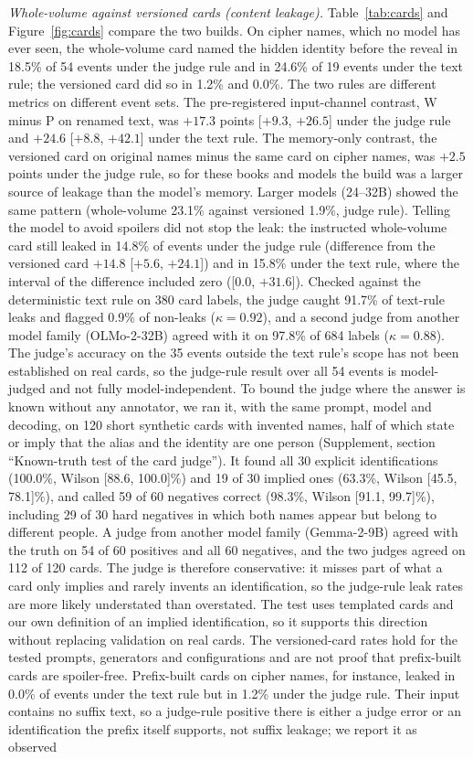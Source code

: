 \documentclass[sn-mathphys]{sn-jnl}%
\theoremstyle{thmstyleone}%
\theoremstyle{thmstyletwo}%
\theoremstyle{thmstylethree}%
\begin{document}
\emph{Whole-volume against versioned cards (content leakage).} Table~\ref{tab:cards} and Figure~\ref{fig:cards} compare the two builds. On cipher names, which no model has ever seen, the whole-volume card named the hidden identity before the reveal in 18.5\% of 54 events under the judge rule and in 24.6\% of 19 events under the text rule; the versioned card did so in 1.2\% and 0.0\%. The two rules are different metrics on different event sets. The pre-registered input-channel contrast, W minus P on renamed text, was $+17.3$ points [$+9.3$, $+26.5$] under the judge rule and $+24.6$ [$+8.8$, $+42.1$] under the text rule. The memory-only contrast, the versioned card on original names minus the same card on cipher names, was $+2.5$ points under the judge rule, so for these books and models the build was a larger source of leakage than the model's memory. Larger models (24--32B) showed the same pattern (whole-volume 23.1\% against versioned 1.9\%, judge rule). Telling the model to avoid spoilers did not stop the leak: the instructed whole-volume card still leaked in 14.8\% of events under the judge rule (difference from the versioned card $+14.8$ [$+5.6$, $+24.1$]) and in 15.8\% under the text rule, where the interval of the difference included zero ([$0.0$, $+31.6$]). Checked against the deterministic text rule on 380 card labels, the judge caught 91.7\% of text-rule leaks and flagged 0.9\% of non-leaks ($\kappa=0.92$), and a second judge from another model family (OLMo-2-32B) agreed with it on 97.8\% of 684 labels ($\kappa=0.88$). The judge's accuracy on the 35 events outside the text rule's scope has not been established on real cards, so the judge-rule result over all 54 events is model-judged and not fully model-independent. To bound the judge where the answer is known without any annotator, we ran it, with the same prompt, model and decoding, on 120 short synthetic cards with invented names, half of which state or imply that the alias and the identity are one person (Supplement, section ``Known-truth test of the card judge''). It found all 30 explicit identifications (100.0\%, Wilson [88.6, 100.0]\%) and 19 of 30 implied ones (63.3\%, Wilson [45.5, 78.1]\%), and called 59 of 60 negatives correct (98.3\%, Wilson [91.1, 99.7]\%), including 29 of 30 hard negatives in which both names appear but belong to different people. A judge from another model family (Gemma-2-9B) agreed with the truth on 54 of 60 positives and all 60 negatives, and the two judges agreed on 112 of 120 cards. The judge is therefore conservative: it misses part of what a card only implies and rarely invents an identification, so the judge-rule leak rates are more likely understated than overstated. The test uses templated cards and our own definition of an implied identification, so it supports this direction without replacing validation on real cards. The versioned-card rates hold for the tested prompts, generators and configurations and are not proof that prefix-built cards are spoiler-free. Prefix-built cards on cipher names, for instance, leaked in 0.0\% of events under the text rule but in 1.2\% under the judge rule. Their input contains no suffix text, so a judge-rule positive there is either a judge error or an identification the prefix itself supports, not suffix leakage; we report it as observed 
\end{document}
